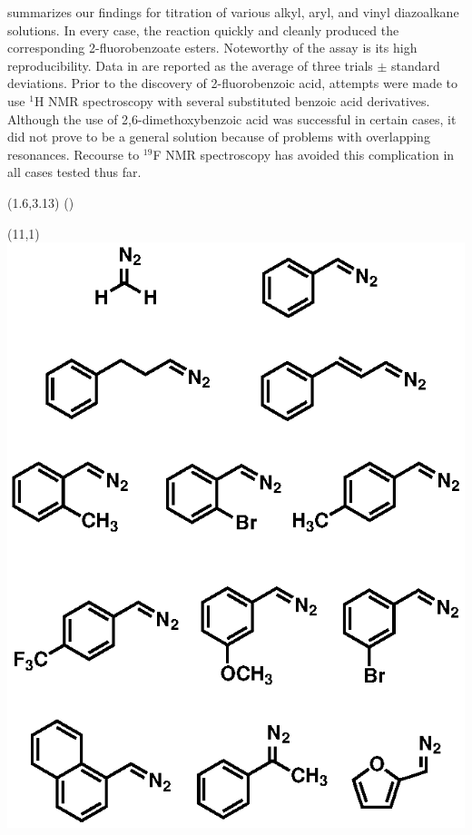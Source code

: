  summarizes our findings for titration of various alkyl, aryl, and vinyl
diazoalkane solutions. In every case, the reaction quickly and cleanly produced the corresponding
2-fluorobenzoate esters.  Noteworthy of the assay is its high reproducibility. Data in
 are reported as the average of three trials $\pm$ standard deviations. Prior to the discovery of 2-fluorobenzoic acid, attempts were made to use $^1$H NMR spectroscopy with several substituted benzoic acid derivatives. Although the use of 2,6-dimethoxybenzoic acid was successful in certain cases, it did not
prove to be a general solution because of problems with overlapping resonances.
Recourse to $^{19}$F NMR spectroscopy has avoided this complication in all cases
tested thus far. 
\begin{table}[ht]
\begin{textblock}{1}(1.6,3.13) \textsf{\scriptsize{()}}\end{textblock}
\begin{textblock}{1}(11,1)
\includegraphics[scale=0.8]{chp_asymmetric/images/titrationchart}\end{textblock}

\end{table}
